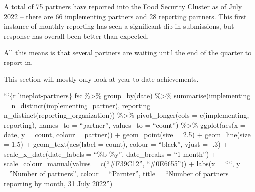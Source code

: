 \documentclass[
]{article}
\begin{document}
A total of 75 partners have reported into the Food Security Cluster as
of July 2022 -- there are 66 implementing partners and 28 reporting
partners. This first instance of monthly reporting has seen a
significant dip in submissions, but response has overall been better
than expected.

All this means is that several partners are waiting until the end of the
quarter to report in.

This section will mostly only look at year-to-date achievements.

```\{r lineplot-partners\} fsc \%\textgreater\% group\_by(date)
\%\textgreater\% summarise(implementing =
n\_distinct(implementing\_partner), reporting =
n\_distinct(reporting\_organization)) \%\textgreater\%
pivot\_longer(cols = c(implementing, reporting), names\_to =
``partner'', values\_to = ``count'') \%\textgreater\% ggplot(aes(x =
date, y = count, colour = partner)) + geom\_point(size = 2.5) +
geom\_line(size = 1.5) + geom\_text(aes(label = count), colour =
``black'', vjust = -.3) + scale\_x\_date(date\_labels = ``\%b-\%y'',
date\_breaks = ``1 month'') + scale\_colour\_manual(values =
c(``\#F39C12'', ``\#0E6655'')) + labs(x = ````, y =''Number of
partners'', colour = ``Parnter\ntype'', title = ``Number of partners
reporting by month, 31 July 2022'')
\end{document}

